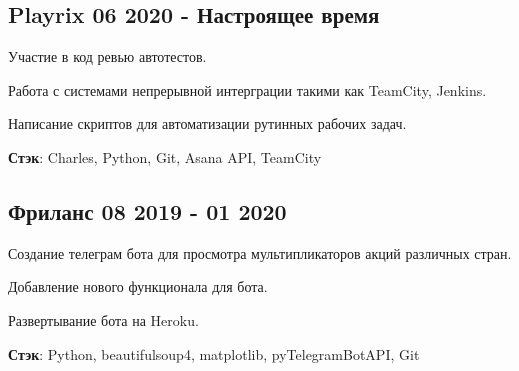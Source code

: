 \documentclass[a4paper,12pt]{article}
\begin{document}


\subsection{{Playrix }\hfill 06 2020 - Настроящее время}

\begin{zitemize}
\item Участие в код ревью автотестов.
\item Работа с системами непрерывной интерграции такими как TeamCity, Jenkins.
\item Написание скриптов для автоматизации рутинных рабочих задач.
\end{zitemize}

\textbf {Стэк}: Charles, Python, Git, Asana API, TeamCity


\vspace*{8pt}

\subsection{{Фриланс }\hfill 08 2019 - 01 2020}

\begin{zitemize}
\item Создание телеграм бота для просмотра мультипликаторов акций различных стран.
\item Добавление нового функционала для бота.
\item Развертывание бота на Heroku.
\end{zitemize}

\textbf {Стэк}: Python, beautifulsoup4, matplotlib, pyTelegramBotAPI, Git
\end{document}
